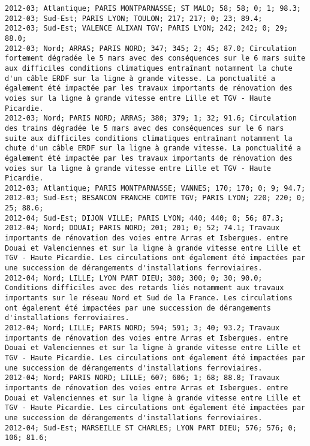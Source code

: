 \documentclass{article}
\begin{document}
\begin{Verbatim}[commandchars=\\\{\}]
2012-03; Atlantique; PARIS MONTPARNASSE; ST MALO; 58; 58; 0; 1; 98.3; 
2012-03; Sud-Est; PARIS LYON; TOULON; 217; 217; 0; 23; 89.4; 
2012-03; Sud-Est; VALENCE ALIXAN TGV; PARIS LYON; 242; 242; 0; 29; 88.0; 
2012-03; Nord; ARRAS; PARIS NORD; 347; 345; 2; 45; 87.0; Circulation fortement dégradée le 5 mars avec des conséquences sur le 6 mars suite aux difficiles conditions climatiques entraînant notamment la chute d'un câble ERDF sur la ligne à grande vitesse. La ponctualité a également été impactée par les travaux importants de rénovation des voies sur la ligne à grande vitesse entre Lille et TGV - Haute Picardie.
2012-03; Nord; PARIS NORD; ARRAS; 380; 379; 1; 32; 91.6; Circulation des trains dégradée le 5 mars avec des conséquences sur le 6 mars suite aux difficiles conditions climatiques entraînant notamment la chute d'un câble ERDF sur la ligne à grande vitesse. La ponctualité a également été impactée par les travaux importants de rénovation des voies sur la ligne à grande vitesse entre Lille et TGV - Haute Picardie.
2012-03; Atlantique; PARIS MONTPARNASSE; VANNES; 170; 170; 0; 9; 94.7; 
2012-03; Sud-Est; BESANCON FRANCHE COMTE TGV; PARIS LYON; 220; 220; 0; 25; 88.6; 
2012-04; Sud-Est; DIJON VILLE; PARIS LYON; 440; 440; 0; 56; 87.3; 
2012-04; Nord; DOUAI; PARIS NORD; 201; 201; 0; 52; 74.1; Travaux importants de rénovation des voies entre Arras et Isbergues. entre Douai et Valenciennes et sur la ligne à grande vitesse entre Lille et TGV - Haute Picardie. Les circulations ont également été impactées par une succession de dérangements d'installations ferroviaires.
2012-04; Nord; LILLE; LYON PART DIEU; 300; 300; 0; 30; 90.0; Conditions difficiles avec des retards liés notamment aux travaux importants sur le réseau Nord et Sud de la France. Les circulations ont également été impactées par une succession de dérangements d'installations ferroviaires.
2012-04; Nord; LILLE; PARIS NORD; 594; 591; 3; 40; 93.2; Travaux importants de rénovation des voies entre Arras et Isbergues. entre Douai et Valenciennes et sur la ligne à grande vitesse entre Lille et TGV - Haute Picardie. Les circulations ont également été impactées par une succession de dérangements d'installations ferroviaires.
2012-04; Nord; PARIS NORD; LILLE; 607; 606; 1; 68; 88.8; Travaux importants de rénovation des voies entre Arras et Isbergues. entre Douai et Valenciennes et sur la ligne à grande vitesse entre Lille et TGV - Haute Picardie. Les circulations ont également été impactées par une succession de dérangements d'installations ferroviaires.
2012-04; Sud-Est; MARSEILLE ST CHARLES; LYON PART DIEU; 576; 576; 0; 106; 81.6; 

\end{Verbatim}
\end{document}
